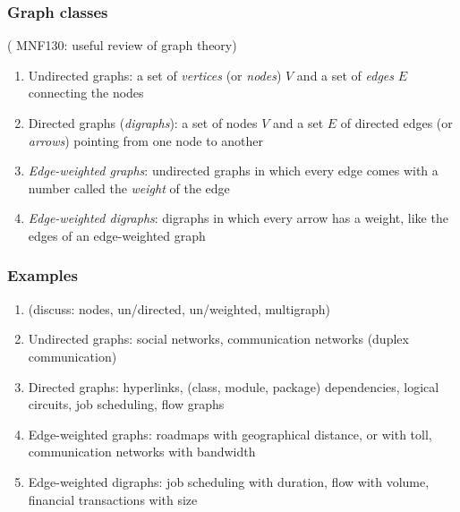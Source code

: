 \documentclass[handout]{beamer}
\newcommand{\set}[1]{\{#1\}}
\begin{document}
\begin{frame}
    \frametitle{Graph classes}

( MNF130: useful review of graph theory)

\begin{enumerate}[<+->]\label{graph_classes}
\item Undirected graphs: a set of \emph{vertices} (or \emph{nodes}) $V$
and a set of \emph{edges} $E$ connecting the nodes
\item Directed graphs (\emph{digraphs}): 
a set of nodes $V$ and a set $E$ of directed edges (or \emph{arrows})
pointing from one node to another
\item \emph{Edge-weighted graphs}: undirected graphs in 
which every edge comes with a number called the \emph{weight} of the edge
\item \emph{Edge-weighted digraphs}: digraphs  in which every arrow has a weight,
like the edges of an edge-weighted graph
\end{enumerate}
\end{frame}

\begin{frame}
    \frametitle{Examples}

\begin{enumerate}[<+->]
\item \href{http://internationalstudentblog.b.uib.no/files/2015/06/Linjekart_sentrum__3962034a.png}%
{\color{red}{Map}} (discuss: nodes, un/directed, un/weighted, multigraph)
\item Undirected graphs: social networks, communication networks (duplex communication)
\item Directed graphs: hyperlinks, (class, module, package) dependencies,
logical circuits, job scheduling, flow graphs
\item Edge-weighted graphs: roadmaps with geographical distance, or with toll,
communication networks with bandwidth
\item Edge-weighted digraphs: job scheduling with duration, flow with volume,
financial transactions with size
\end{enumerate}
\end{frame}
\end{document}
